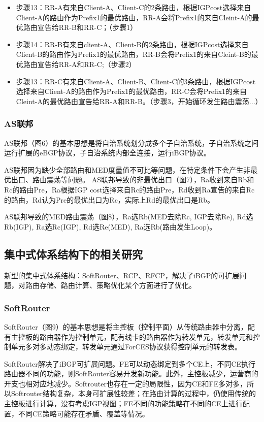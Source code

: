 \begin{itemize}
\item 步骤13：RR-A有来自Client-A、Client-C的2条路由，根据IGPcost选择来自Client-A的路由作为Prefix1的最优路由，RR-A会将Prefix1的来自Cleint-A的最优路由宣告给RR-B和RR-C；（步骤1）
\item 步骤14：RR-B有来自client-A、Client-B的2条路由，根据IGPcost选择来自Client-B的路由作为Prefix1的最优路由，RR-B会将Prefix1的来自Cleint-B的最优路由宣告给RR-A和RR-C;（步骤2）
\item 步骤13：RR-C有来自Client-A、Client-B、Client-C的3条路由，根据IGPcost选择来自Client-A的路由作为Prefix1的最优路由，RR-C会将Prefix1的来自Cleint-A的最优路由宣告给RR-A和RR-B。（步骤3，开始循环发生路由震荡...）

\end{itemize}



\subsubsection{AS联邦}
AS联邦（图6）的基本思想是将自治系统划分成多个子自治系统，子自治系统之间运行扩展的eBGP协议，子自治系统内部全连接，运行iBGP协议。

AS联邦因为缺少全部路由和MED度量值不可比等问题，在特定条件下会产生非最优出口、路由震荡等问题。
AS联邦导致的非最优出口（图7），Ra收到来自Rb和Rc的路由Pre，Ra根据IGP cost选择来自Rc的路由Pre，Rd收到Ra宣告的来自Rc的路由，Rd认为Pre的最优出口为Rc，实际上Rd的最优出口是Rb。

AS联邦导致的MED路由震荡（图8），Ra选Rb(MED去除Rc, IGP去除Re), Rd选Rb(IGP), Ra选Rc(IGP), Rd选Re(MED), Ra选Rb(路由发生Loop)。

\subsection{集中式体系结构下的相关研究}
新型的集中式体系结构：SoftRouter、RCP、RFCP，解决了iBGP的可扩展问题，对路由存储、路由计算、策略优化某个方面进行了优化。
\subsubsection{SoftRouter}
SoftRouter（图9）的基本思想是将主控板（控制平面）从传统路由器中分离，配有主控板的路由器作为控制单元，配有线卡的路由器作为转发单元，转发单元和控制单元多对多动态绑定，转发单元通过ForCES协议获得控制单元的转发表。

SoftRouter解决了iBGP可扩展问题。FE可以动态绑定到多个CE上，不同CE执行路由器不同的功能，则SoftRouter容易开发新功能。此外，主控板减少，运营商的开支也相对应地减少。Softrouter也存在一定的局限性，因为CE和FE多对多，所以Softrouter结构复杂，本身可扩展性较差；在路由计算的过程中，仍使用传统的主控板进行计算，没有考虑IGP视图；FE不同的功能策略在不同的CE上进行配置，不同CE策略可能存在矛盾、覆盖等情况。

